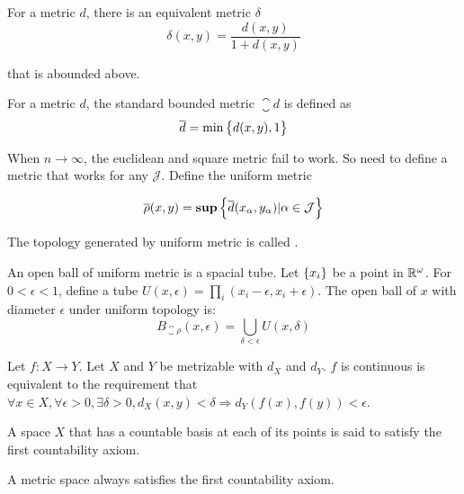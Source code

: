 \begin{theorem}
    For a metric $d$, there is an equivalent metric $\delta$
    \begin{equation}
        \delta (x,y) = \frac{d(x,y)}{1+d(x,y)}
    \end{equation}    
    
    that is abounded above.
\end{theorem}


\begin{definition}
    For a metric $d$, the standard bounded metric \emph{$\closure{d}$} is defined as
    \begin{equation}
        \overline{d} = \min \set{d(x,y), 1}
    \end{equation}
\end{definition}


\begin{definition}
    When $n \rightarrow \infty$, the euclidean and square metric fail to work. So need to define a metric that works for any $\mathcal{J}$. Define the uniform metric 
    
    \begin{equation}
        \overline{\rho}(x,y) = \mathbf{sup} \set{ \overline{d}(x_{\alpha}, y_{\alpha}) | \alpha \in \mathcal{J}}
    \end{equation}
    
    The topology generated by uniform metric is called .
    
    An open ball of uniform metric is a spacial tube. Let $\set{x_i}$ be a point in $\mathbb{R}^\omega$. For $0 < \epsilon < 1$, define a tube $U(x,\epsilon) = \prod_i (x_i - \epsilon, x_i + \epsilon)$. The open ball of $x$ with diameter $\epsilon$ under uniform topology is:
    \begin{equation}
        B_{\closure{\rho}}(x, \epsilon) = \bigcup_{\delta < \epsilon} U(x, \delta)
    \end{equation}
\end{definition}

\begin{theorem}
Let $f: X \rightarrow Y$. Let $X$ and $Y$ be metrizable with $d_X$ and $d_Y$. $f$ is continuous is equivalent to the requirement that $\forall x \in X, \forall \epsilon > 0, \exists \delta > 0, d_X (x,y) < \delta \Rightarrow d_Y \left(f(x), f(y) \right) < \epsilon $.
\end{theorem}


\begin{definition}\label{first_countability_axiom}
    A space $X$ that has a countable basis at each of its points is said to satisfy the first countability axiom. 
    
    A metric space always satisfies the first countability axiom.
\end{definition}

